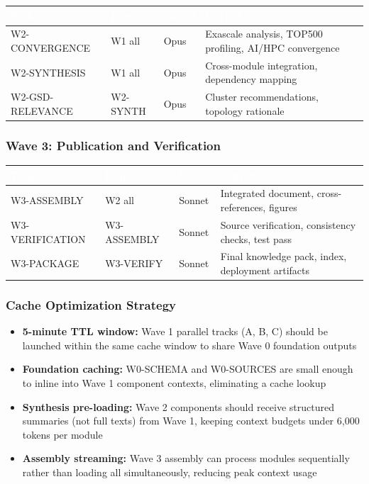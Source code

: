\documentclass[11pt,letterpaper]{article}
\newcommand{\tableheader}[1]{\textbf{\sffamily\textcolor{white}{#1}}}
\begin{document}
\begin{center}
\begin{tabularx}{\textwidth}{L{3.5cm}L{2cm}C{1.5cm}X}
\toprule
{}
\tableheader{Task} & \tableheader{Deps} & \tableheader{Model} & \tableheader{Output} \\
\midrule
W2-CONVERGENCE & W1 all & Opus & Exascale analysis, TOP500 profiling, AI/HPC convergence \\
W2-SYNTHESIS & W1 all & Opus & Cross-module integration, dependency mapping \\
W2-GSD-RELEVANCE & W2-SYNTH & Opus & Cluster recommendations, topology rationale \\
\bottomrule
\end{tabularx}
\end{center}

\subsubsection{Wave 3: Publication and Verification}

\begin{center}
\begin{tabularx}{\textwidth}{L{3.5cm}L{2.5cm}C{1.5cm}X}
\toprule
{}
\tableheader{Task} & \tableheader{Deps} & \tableheader{Model} & \tableheader{Output} \\
\midrule
W3-ASSEMBLY & W2 all & Sonnet & Integrated document, cross-references, figures \\
W3-VERIFICATION & W3-ASSEMBLY & Sonnet & Source verification, consistency checks, test pass \\
W3-PACKAGE & W3-VERIFY & Sonnet & Final knowledge pack, index, deployment artifacts \\
\bottomrule
\end{tabularx}
\end{center}

\subsubsection{Cache Optimization Strategy}

\begin{itemize}[leftmargin=2em]
\item \textbf{5-minute TTL window:} Wave 1 parallel tracks (A, B, C) should be launched within the same cache window to share Wave 0 foundation outputs
\item \textbf{Foundation caching:} W0-SCHEMA and W0-SOURCES are small enough to inline into Wave 1 component contexts, eliminating a cache lookup
\item \textbf{Synthesis pre-loading:} Wave 2 components should receive structured summaries (not full texts) from Wave 1, keeping context budgets under 6,000 tokens per module
\item \textbf{Assembly streaming:} Wave 3 assembly can process modules sequentially rather than loading all simultaneously, reducing peak context usage
\end{itemize}
\end{document}

